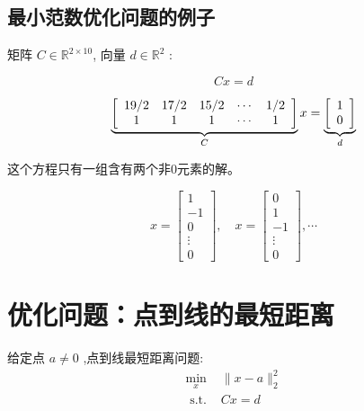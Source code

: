 \subsection{最小范数优化问题的例子}

\begin{problem}
    矩阵 $ C \in \mathbb{R}^{2 \times 10} $, 向量 $ d \in \mathbb{R}^{2} $ :

\begin{equation}Cx=d\end{equation}

\begin{equation}\displaystyle \underbrace{\left[\begin{array}{ c c c c c }
    19/2 & 17/2 & 15/2 & \cdots  & 1/2\\
    1 & 1 & 1 & \cdots  & 1
    \end{array}\right]}_{C} x=\underbrace{\left[\begin{array}{ l }
    1\\
    0
    \end{array}\right]}_{d}\end{equation}
\end{problem}

这个方程只有一组含有两个非0元素的解。

\begin{equation}
x=\left[\begin{array}{c}
1 \\
-1 \\
0 \\
\vdots \\
0
\end{array}\right], \quad x=\left[\begin{array}{c}
0 \\
1 \\
-1 \\
\vdots \\
0
\end{array}\right], \cdots
\end{equation}

\section{优化问题：点到线的最短距离}

\begin{problem}
    给定点 $ a \neq 0 $ ,点到线最短距离问题:
\begin{equation}
\begin{array}{ll}
\min _{x} & \|x-a\|_{2}^{2} \\
\text { s.t. } & C x=d
\end{array}
\end{equation}

\end{problem}

